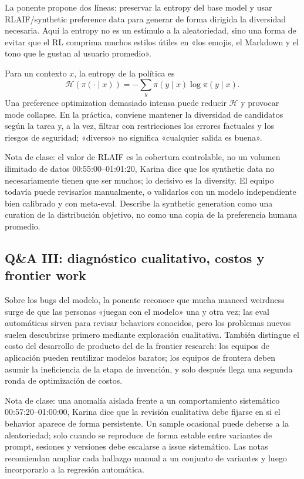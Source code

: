 La ponente propone dos líneas: preservar la entropy del base model y usar RLAIF/synthetic preference data para generar de forma dirigida la diversidad necesaria. Aquí la entropy no es un estímulo a la aleatoriedad, sino una forma de evitar que el RL comprima muchos estilos útiles en «los emojis, el Markdown y el tono que le gustan al usuario promedio».

Para un contexto $x$, la entropy de la política es
\[
\mathcal{H}(\pi(\cdot\mid x))=-\sum_y \pi(y\mid x)\log \pi(y\mid x).
\]
Una preference optimization demasiado intensa puede reducir $\mathcal{H}$ y provocar mode collapse. En la práctica, conviene mantener la diversidad de candidatos según la tarea y, a la vez, filtrar con restricciones los errores factuales y los riesgos de seguridad; «diverso» no significa «cualquier salida es buena».

\begin{importantbox}{Nota de clase: el valor de RLAIF es la cobertura controlable, no un volumen ilimitado de datos}
00:55:00--01:01:20, Karina dice que los synthetic data no necesariamente tienen que ser muchos; lo decisivo es la diversity. El equipo todavía puede revisarlos manualmente, o validarlos con un modelo independiente bien calibrado y con meta-eval. Describe la synthetic generation como una curation de la distribución objetivo, no como una copia de la preferencia humana promedio.
\end{importantbox}

\subsection{Q\&A III: diagnóstico cualitativo, costos y frontier work}

Sobre los bugs del modelo, la ponente reconoce que mucha nuanced weirdness surge de que las personas «juegan con el modelo» una y otra vez; las eval automáticas sirven para revisar behaviors conocidos, pero los problemas nuevos suelen descubrirse primero mediante exploración cualitativa. También distingue el costo del desarrollo de producto del de la frontier research: los equipos de aplicación pueden reutilizar modelos baratos; los equipos de frontera deben asumir la ineficiencia de la etapa de invención, y solo después llega una segunda ronda de optimización de costos.

\begin{knowledgebox}{Nota de clase: una anomalía aislada frente a un comportamiento sistemático}
00:57:20--01:00:00, Karina dice que la revisión cualitativa debe fijarse en si el behavior aparece de forma persistente. Un sample ocasional puede deberse a la aleatoriedad; solo cuando se reproduce de forma estable entre variantes de prompt, sesiones y versiones debe escalarse a issue sistemático. Las notas recomiendan ampliar cada hallazgo manual a un conjunto de variantes y luego incorporarlo a la regresión automática.
\end{knowledgebox}

